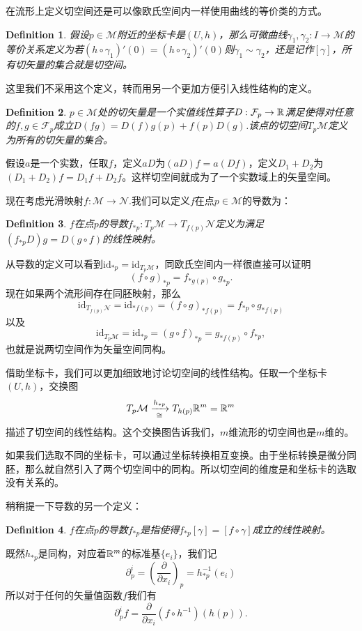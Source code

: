 \documentclass[8pt]{book}
\theoremstyle{plain}%
\newtheorem{defi}{Definition}[section]%
\begin{document}
在流形上定义切空间还是可以像欧氏空间内一样使用曲线的等价类的方式。
\begin{defi}
假设$p\in \mathcal{M}$附近的坐标卡是$(U,h)$，那么可微曲线$\gamma_1,\gamma_2:I\to \mathcal{M}$的等价关系定义为若$(h\circ\gamma_1)'(0)=(h\circ\gamma_2)'(0)$则$\gamma_1\sim\gamma_2$，还是记作$\left[\gamma\right]$，所有切矢量的集合就是切空间。
\end{defi}
这里我们不采用这个定义，转而用另一个更加方便引入线性结构的定义。

\begin{defi}
$p\in \mathcal{M}$处的切矢量是一个实值线性算子$D:\mathcal{F}_p\to\mathbb{R}$满足使得对任意的$f,g\in \mathcal{F}_p$成立$D(fg)=D(f)g(p)+f(p)D(g)$.该点的切空间$T_p\mathcal{M}$定义为所有的切矢量的集合。
\end{defi}
假设$a$是一个实数，任取$f$，定义$aD$为$(aD)f=a(Df)$，定义$D_1+D_2$为$(D_1+D_2)f=D_1f+D_2f$。这样切空间就成为了一个实数域上的矢量空间。

现在考虑光滑映射$f:\mathcal{M}\to \mathcal{N}$.我们可以定义$f$在点$p \in \mathcal{M}$的导数为：
\begin{defi}
	$f$在点$p$的导数$f_{*p}:T_p\mathcal{M} \to T_{f(p)}\mathcal{N}$定义为满足$\left(f_{*p}D\right)g=D(g\circ f)$的线性映射。
\end{defi}

从导数的定义可以看到$\mathrm{id}_{*p}=\mathrm{id}_{T_p\mathcal{M}}$，同欧氏空间内一样很直接可以证明\[(f\circ g)_{*p}=f_{*g(p)}\circ g_{*p}.\]
现在如果两个流形间存在同胚映射，那么
\[\mathrm{id}_{T_{f(p)}\mathcal{N}}=\mathrm{id}_{*f(p)}=(f\circ g)_{*f(p)}=f_{*p}\circ g_{*f(p)}\]
以及
\[\mathrm{id}_{T_p\mathcal{M}}=\mathrm{id}_{*p}=(g\circ f)_{*p}=g_{*f(p)}\circ f_{*p},\]
也就是说两切空间作为矢量空间同构。

借助坐标卡，我们可以更加细致地讨论切空间的线性结构。任取一个坐标卡$(U,h)$，交换图
\[
	T_{p}\mathcal{M}\xrightarrow[\cong]{h_{*p}}T_{h(p)}\mathbb{R}^m=\mathbb{R}^m
\]
描述了切空间的线性结构。这个交换图告诉我们，$m$维流形的切空间也是$m$维的。

如果我们选取不同的坐标卡，可以通过坐标转换相互变换。由于坐标转换是微分同胚，那么就自然引入了两个切空间中的同构。所以切空间的维度是和坐标卡的选取没有关系的。

稍稍提一下导数的另一个定义：
\begin{defi}
	$f$在点$p$的导数$f_{*p}$是指使得$f_{*p}[\gamma]=\left[f\circ \gamma\right]$成立的线性映射。
\end{defi}

既然$h_{*p}$是同构，对应着$\mathbb{R}^m$的标准基$\{e_i\}$，我们记
\[
	\partial^i_p=\left(\frac{\partial}{\partial x_i}\right)_p=h_{*p}^{-1}\left(e_i\right)
\]
所以对于任何的矢量值函数$f$我们有
\[
	\partial^i_pf=\frac{\partial}{\partial x_i}\left(f\circ h^{-1}\right)(h(p)).
\]
\end{document}
